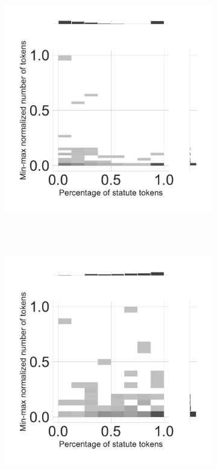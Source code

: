 \documentclass[varwidth, border=0pt]{standalone}
\begin{document}
	
	\begin{figure}
	\centering
\begin{subfigure}{0.5\linewidth}
	\includegraphics[width=\linewidth]{../../graphics/family-compositions/family-hist2d-us-2019.pdf}~%
\end{subfigure}%
~
\begin{subfigure}{0.5\linewidth}
	\includegraphics[width=\linewidth]{../../graphics/family-compositions/family-hist2d-de-2019.pdf}~%
\end{subfigure}
	\end{figure}
	
\end{document}
